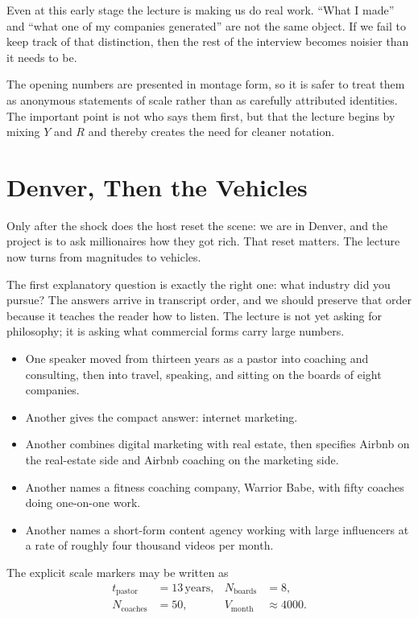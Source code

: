 Even at this early stage the lecture is making us do real work. ``What I made'' and ``what one of my companies generated'' are not the same object. If we fail to keep track of that distinction, then the rest of the interview becomes noisier than it needs to be.

\begin{remark}
The opening numbers are presented in montage form, so it is safer to treat them as anonymous statements of scale rather than as carefully attributed identities. The important point is not who says them first, but that the lecture begins by mixing \(Y\) and \(R\) and thereby creates the need for cleaner notation.
\end{remark}

\section{Denver, Then the Vehicles}

Only after the shock does the host reset the scene: we are in Denver, and the project is to ask millionaires how they got rich. That reset matters. The lecture now turns from magnitudes to vehicles.

The first explanatory question is exactly the right one: what industry did you pursue? The answers arrive in transcript order, and we should preserve that order because it teaches the reader how to listen. The lecture is not yet asking for philosophy; it is asking what commercial forms carry large numbers.

\begin{itemize}
\item One speaker moved from thirteen years as a pastor into coaching and consulting, then into travel, speaking, and sitting on the boards of eight companies.
\item Another gives the compact answer: internet marketing.
\item Another combines digital marketing with real estate, then specifies Airbnb on the real-estate side and Airbnb coaching on the marketing side.
\item Another names a fitness coaching company, Warrior Babe, with fifty coaches doing one-on-one work.
\item Another names a short-form content agency working with large influencers at a rate of roughly four thousand videos per month.
\end{itemize}

The explicit scale markers may be written as
\begin{align}
t_{\mathrm{pastor}} &= 13\,\mathrm{years}, &
N_{\mathrm{boards}} &= 8, \\
N_{\mathrm{coaches}} &= 50, &
V_{\mathrm{month}} &\approx 4000.
\end{align}

